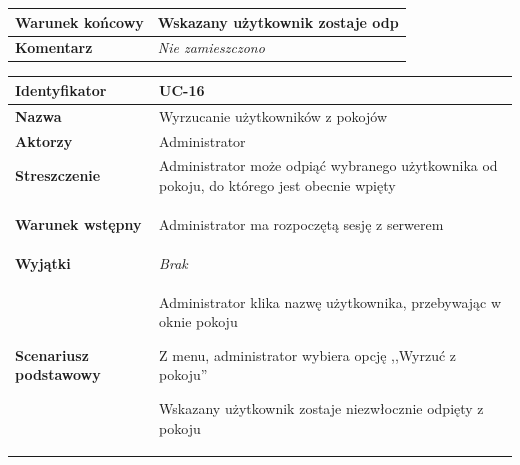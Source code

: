 {\begin{tabular}{ | l | l | }
	\hline
		\parbox[t]{4cm}{\textbf{Warunek końcowy}} & \parbox[t]{11cm}{
			Wskazany użytkownik zostaje odp
		}
		\\
		
	\hline
		\parbox[t]{4cm}{\textbf{Komentarz}} & \parbox[t]{11cm}{
			\textit{Nie zamieszczono}
		}
		\\

	\hline
\end{tabular}

\vspace{2em}

\begin{tabular}{ | l | l | }
	\hline
		\textbf{Identyfikator} & 
		UC-16
		\\
		
	\hline
		\textbf{Nazwa} & 
		Wyrzucanie użytkowników z pokojów
		\\
		
	\hline
		\textbf{Aktorzy} & \parbox[t]{11cm}{
			Administrator
		}\\
		 
	\hline
		\parbox[t]{4cm}{\textbf{Streszczenie}} & \parbox[t]{11cm}{
			Administrator może odpiąć wybranego użytkownika od pokoju, do
			którego jest obecnie wpięty
			
		}\\
		
	\hline
		\parbox[t]{4cm}{\textbf{Warunek wstępny}} & \parbox[t]{11cm}{
			\begin{enumreq}
				\item Administrator ma rozpoczętą sesję z serwerem
			\end{enumreq}
				
		}
		\\
		
	\hline
		\parbox[t]{4cm}{\textbf{Wyjątki}} & \parbox[t]{11cm}{
			\textit{Brak}
			
		}
		\\

	\hline
		\parbox[t]{4cm}{\textbf{Scenariusz podstawowy}} & \parbox[t]{11cm}{
			\begin{enumreq}
				\item Administrator klika nazwę użytkownika, przebywając
				w oknie pokoju
				\item Z menu, administrator wybiera opcję ,,Wyrzuć z pokoju''
				\item Wskazany użytkownik zostaje niezwłocznie odpięty z 
				pokoju
			\end{enumreq}
		}
		\\
		

\end{tabular}}
